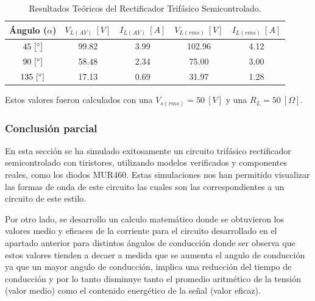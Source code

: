\documentclass[12pt,a4paper]{article}
\begin{document}
\begin{table}[H]
    \centering
    \begin{tabular}{|c|c|c|c|c|} \hline
        \textbf{Ángulo ($\alpha$)} & $V_{L(AV)} \ [V]$ & $I_{L(AV)} \ [A]$ & $V_{L(rms)} \ [V]$ & $I_{L(rms)} \ [A]$ \\ \hline
            $45 \ [\degree]$   & 99.82 & 3.99 & 102.96 & 4.12 \\ \hline
            $90 \ [\degree]$   & 58.48 & 2.34 & 75.00 & 3.00 \\ \hline
            $135 \ [\degree]$  & 17.13 & 0.69 & 31.97 & 1.28 \\ \hline
    \end{tabular}
    \caption{Resultados Teóricos del Rectificador Trifásico Semicontrolado.}
\end{table}

Estos valores fueron calculados con una $V_{s(rms)} = 50 \ [V]$ y una $R_{L} = 50 \ [\Omega]$.

\subsubsection{Conclusión parcial}
En esta sección se ha simulado exitosamente un circuito trifásico rectificador semicontrolado con tiristores, utilizando modelos verificados y componentes reales, como los diodos MUR460. Estas simulaciones nos han permitido visualizar las formas de onda de este circuito las cuales son las correspondientes a un circuito de este estilo.

Por otro lado, se desarrollo un calculo matemático donde se obtuvieron los valores medio y eficaces de la corriente para el circuito desarrollado en el apartado anterior para distintos ángulos de conducción donde ser observa que estos valores tienden a decaer a medida que se aumenta el angulo de conducción ya que un mayor angulo de conducción, implica una reducción del tiempo de conducción y por lo tanto disminuye tanto el promedio aritmético de la tensión (valor medio) como el contenido energético de la señal (valor eficaz).
\end{document}
